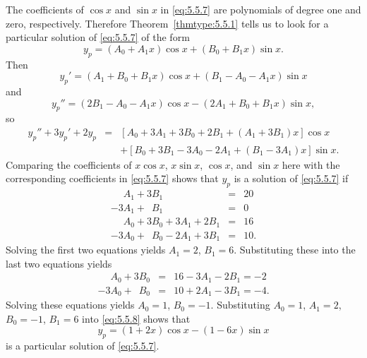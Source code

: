 \begin{examplesolution}
\solution The coefficients of $\cos x$ and $\sin x$ in \eqref{eq:5.5.7} are polynomials of degree
one and zero, respectively. Therefore Theorem~\ref{thmtype:5.5.1} tells us to look for a particular
solution of \eqref{eq:5.5.7} of the form
\begin{equation}
  \label{eq:5.5.8}y_{p}=(A_{0}+A_{1}x)\cos x+(B_{0}+B_{1}x)\sin x.
\end{equation}
Then
\begin{equation}
  \label{eq:5.5.9}y_{p}'=(A_{1}+B_{0}+B_{1}x)\cos x+(B_{1}-A_{0}-A_{1}x)\sin x
\end{equation}
and
\begin{equation}
  \label{eq:5.5.10}y_{p}''=(2B_{1}-A_{0}-A_{1}x)\cos x-(2A_{1}+B_{0}+B_{1}x)\sin x,
\end{equation}
so
\begin{equation}
  \label{eq:5.5.11}
  \begin{array}{rcl}
    y_{p}''+3y_{p}'+2y_{p} & = & \left[A_{0}+3A_{1}+3B_{0}+2B_{1}+(A_{1}+3B_{1})x\right]\cos x   \\
                           &   & +\left[B_{0}+3B_{1}-3A_{0}-2A_{1}+(B_{1}-3A_{1})x\right]\sin x.
  \end{array}
\end{equation}
Comparing the coefficients of $x\cos x$, $x\sin x$, $\cos x$, and $\sin x$ here with the
corresponding coefficients in \eqref{eq:5.5.7} shows that $y_{p}$ is a solution of \eqref{eq:5.5.7}
if
\[
  \begin{array}{rcr}
    \phantom{-3}A_{1}+3B_{1}               & = & 20\phantom{.} \\
    -3A_{1}+\phantom{3}B_{1}               & = & 0\phantom{.}  \\
    \phantom{-3}A_{0}+3B_{0}+3A_{1}+2B_{1} & = & 16\phantom{.} \\
    -3A_{0}+\phantom{3}B_{0}-2A_{1}+3B_{1} & = & 10.
  \end{array}
\]
Solving the first two equations yields $A_{1}=2$, $B_{1}=6$. Substituting these into the last two
equations yields
\begin{eqnarray*}
  \phantom{-3}A_{0}+3B_{0} & = & 16-3A_{1}-2B_{1}=-2\phantom{.} \\
  -3A_{0}+\phantom{3}B_{0} & = & 10+2A_{1}-3B_{1}=-4.
\end{eqnarray*}
Solving these equations yields $A_{0}=1$, $B_{0}=-1$. Substituting $A_{0}=1$, $A_{1}=2$, $B_{0}=-1$,
$B_{1}=6$ into \eqref{eq:5.5.8} shows that
\[
  y_{p}=(1+2x)\cos x-(1-6x)\sin x
\]
is a particular solution of \eqref{eq:5.5.7}.
\end{examplesolution}


